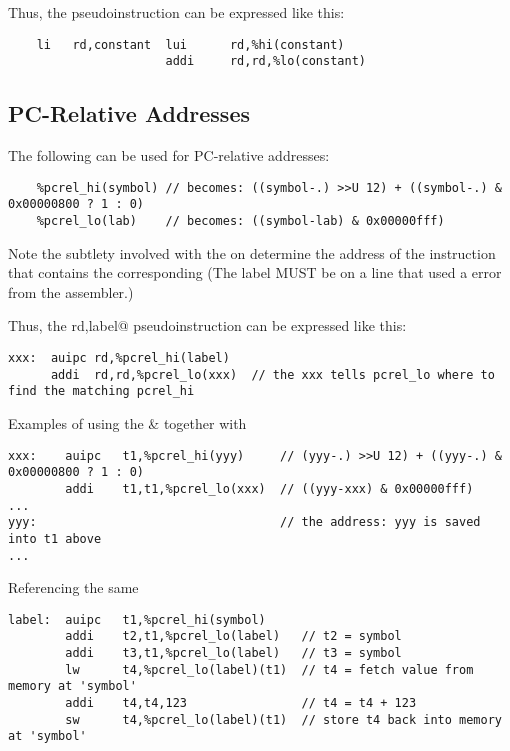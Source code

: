 Thus, the \verb@li@ pseudoinstruction can be expressed like this:

{\small
\begin{verbatim}
    li   rd,constant  lui      rd,%hi(constant)
                      addi     rd,rd,%lo(constant)
\end{verbatim}
}



\subsection{PC-Relative Addresses}

The following can be used for PC-relative addresses:
{\small
\begin{verbatim}
    %pcrel_hi(symbol) // becomes: ((symbol-.) >>U 12) + ((symbol-.) & 0x00000800 ? 1 : 0)
    %pcrel_lo(lab)    // becomes: ((symbol-lab) & 0x00000fff)
\end{verbatim}
}

Note the subtlety involved with the \verb@lab@ on \verb@%pcrel_lo@. It is needed to 
determine the address of the instruction that contains the corresponding \verb@%pcrel_hi@.
(The label \verb@lab@ MUST be on a line that used a \verb@%pcrel_hi()@ or get an 
error from the assembler.)

Thus, the \verb@la rd,label@ pseudoinstruction can be expressed like this:
{\small
\begin{verbatim}
xxx:  auipc rd,%pcrel_hi(label)
      addi  rd,rd,%pcrel_lo(xxx)  // the xxx tells pcrel_lo where to find the matching pcrel_hi
\end{verbatim}
}

Examples of using the \verb@auipc@ \& \verb@addi@ together with \verb@%pcrel_hi()@ and
\verb@%pcrel_lo()@:

{\small
\begin{verbatim}
xxx:    auipc   t1,%pcrel_hi(yyy)     // (yyy-.) >>U 12) + ((yyy-.) & 0x00000800 ? 1 : 0)
        addi    t1,t1,%pcrel_lo(xxx)  // ((yyy-xxx) & 0x00000fff)
...
yyy:                                  // the address: yyy is saved into t1 above
...
\end{verbatim}
}


Referencing the same \verb@%pcrel_hi@ in multiple subsequent uses of \verb@%pcrel_lo@ is legal:
{\small
\begin{verbatim}
label:  auipc   t1,%pcrel_hi(symbol)
        addi    t2,t1,%pcrel_lo(label)   // t2 = symbol
        addi    t3,t1,%pcrel_lo(label)   // t3 = symbol
        lw      t4,%pcrel_lo(label)(t1)  // t4 = fetch value from memory at 'symbol'
        addi    t4,t4,123                // t4 = t4 + 123
        sw      t4,%pcrel_lo(label)(t1)  // store t4 back into memory at 'symbol'
\end{verbatim}
}


